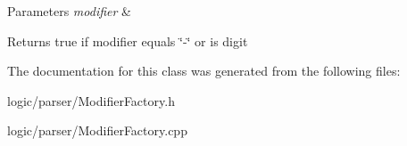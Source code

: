 \begin{DoxyParams}{Parameters}
{\em modifier} & \\
\hline
\end{DoxyParams}
\begin{DoxyReturn}{Returns}
true if modifier equals \char`\"{}-\/\char`\"{} or is digit 
\end{DoxyReturn}


The documentation for this class was generated from the following files\+:\begin{DoxyCompactItemize}
\item 
logic/parser/Modifier\+Factory.\+h\item 
logic/parser/Modifier\+Factory.\+cpp\end{DoxyCompactItemize}
